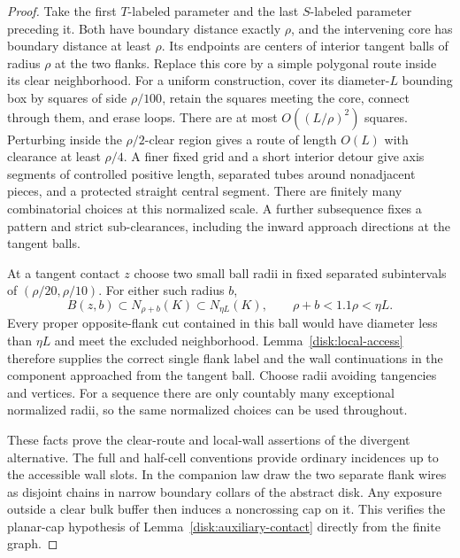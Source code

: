 \begin{proof}
Take the first $T$-labeled parameter and the last $S$-labeled parameter
preceding it.  Both have boundary distance exactly $\rho$, and the
intervening core has boundary distance at least $\rho$.  Its endpoints
are centers of interior tangent balls of radius $\rho$ at the two
flanks.  Replace this core by a simple polygonal route inside its clear
neighborhood.  For a uniform construction, cover its diameter-$L$
bounding box by squares of side $\rho/100$, retain the squares meeting
the core, connect through them, and erase loops.  There are at most
$O((L/\rho)^2)$ squares.  Perturbing inside the $\rho/2$-clear region
gives a route of length $O(L)$ with clearance at least $\rho/4$.
A finer fixed grid and a short interior detour give axis segments of
controlled positive length, separated tubes around nonadjacent pieces,
and a protected straight central segment.  There are finitely many
combinatorial choices at this normalized scale.  A further subsequence
fixes a pattern and strict sub-clearances, including the inward approach
directions at the tangent balls.

At a tangent contact $z$ choose two small ball radii in fixed separated
subintervals of $(\rho/20,\rho/10)$.  For either such radius $b$,
\begin{equation}\label{disk:terminal-containment}
 B(z,b)\subset N_{\rho+b}(K)\subset N_{\eta L}(K),
 \qquad \rho+b<1.1\rho<\eta L.
\end{equation}
Every proper opposite-flank cut contained in this ball would have
diameter less than $\eta L$ and meet the excluded neighborhood.
Lemma~\ref{disk:local-access} therefore supplies the correct single
flank label and the wall continuations in the component approached
from the tangent ball.  Choose radii avoiding tangencies and vertices.
For a sequence there are only countably many exceptional normalized
radii, so the same normalized choices can be used throughout.

These facts prove the clear-route and local-wall assertions of the divergent
alternative.  The full and half-cell conventions provide ordinary
incidences up to the accessible wall slots.  In the companion law draw
the two separate flank wires as disjoint chains in narrow boundary
collars of the abstract disk.  Any exposure outside a clear bulk buffer
then induces a noncrossing cap on it.  This verifies the planar-cap
hypothesis of Lemma~\ref{disk:auxiliary-contact} directly from the
finite graph.


\end{proof}
